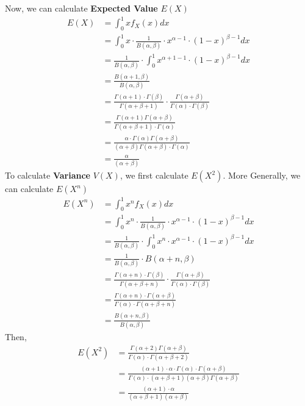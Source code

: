 \documentclass[11pt,oneside]{book}
\theoremstyle{break}
\theoremstyle{break}
\begin{document}
Now, we can calculate \textbf{Expected Value} $E(X)$\begin{align*}
E(X)&=\int_{0}^{1}xf_X(x)dx\\
&=\int_{0}^{1}x\cdot  \frac{1}{B(\alpha,\beta)}\cdot x^{\alpha-1}\cdot (1-x)^{\beta-1} dx\\
&= \frac{1}{B(\alpha,\beta)} \cdot \int_{0}^{1} x^{\alpha+1-1}\cdot (1-x)^{\beta-1}dx\\
&=\frac{B(\alpha+1,\beta)}{B(\alpha,\beta)}\\
&=\frac{\Gamma(\alpha+1)\cdot \Gamma(\beta)}{\Gamma(\alpha+\beta+1)}\cdot \frac{\Gamma(\alpha+\beta)}{\Gamma(\alpha)\cdot\Gamma(\beta)}\\
&=\frac{\Gamma(\alpha+1)\Gamma(\alpha+\beta)}{\Gamma(\alpha+\beta+1)\cdot \Gamma(\alpha)}\\
&=\frac{\alpha\cdot \Gamma(\alpha)\Gamma(\alpha+\beta)}{(\alpha+\beta)\Gamma(\alpha+\beta)\cdot \Gamma(\alpha)}\\
&=\frac{\alpha}{(\alpha+\beta)}
\end{align*}
To calculate \textbf{Variance} $V(X)$, we first calculate $E(X^2)$. More Generally, we can calculate $E(X^n)$\begin{align*}
E(X^n)&=\int_{0}^{1}x^nf_X(x)dx\\
&=\int_{0}^{1}x^n\cdot \frac{1}{B(\alpha,\beta)}\cdot x^{\alpha-1}\cdot (1-x)^{\beta-1}dx\\
&=\frac{1}{B(\alpha,\beta)}\cdot\int_{0}^{1}x^n\cdot  x^{\alpha-1}\cdot (1-x)^{\beta-1}dx\\
&=\frac{1}{B(\alpha,\beta)}\cdot B(\alpha+n,\beta)\\
&=\frac{\Gamma(\alpha+n)\cdot \Gamma(\beta)}{\Gamma(\alpha+\beta+n)}\cdot \frac{\Gamma(\alpha+\beta)}{\Gamma(\alpha)\cdot \Gamma(\beta)}\\
&=\frac{\Gamma(\alpha+n)\cdot \Gamma(\alpha+\beta)}{\Gamma(\alpha)\cdot \Gamma(\alpha+\beta+n)}\\
&=\frac{B(\alpha+n,\beta)}{B(\alpha,\beta)}
\end{align*}
Then, \begin{align*}
E(X^2)&=\frac{\Gamma(\alpha+2)\Gamma(\alpha+\beta)}{\Gamma(\alpha)\cdot \Gamma(\alpha+\beta+2)}\\
&=\frac{(\alpha +1)\cdot \alpha \cdot \Gamma(\alpha)\cdot \Gamma(\alpha+\beta)}{\Gamma(\alpha)\cdot (\alpha+\beta+1)(\alpha+\beta)\Gamma(\alpha+\beta)}\\
&=\frac{(\alpha +1)\cdot \alpha }{ (\alpha+\beta+1)(\alpha+\beta)}
\end{align*}
\end{document}
